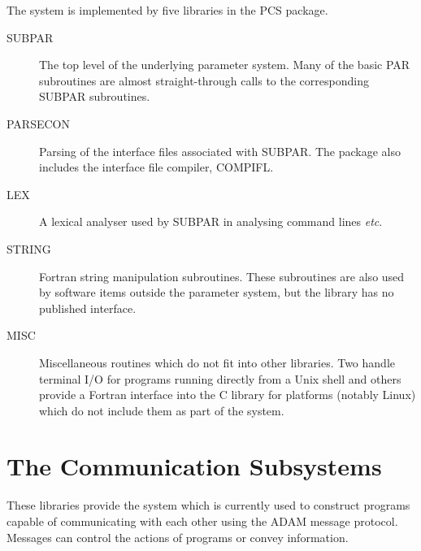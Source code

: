 \documentclass[twoside,11pt]{article}
\newcommand{\xlabel}[1]{}
\renewcommand{\_}{\texttt{\symbol{95}}}
\begin{document}
The system is implemented by five libraries in the PCS package.
\begin{description}
\item[SUBPAR] The top level of the underlying parameter system. Many
of the basic PAR subroutines are almost straight-through calls to the 
corresponding SUBPAR subroutines.
\item[PARSECON] Parsing of the interface files associated with SUBPAR.
The package also includes the interface file compiler, COMPIFL.
\item[LEX] A lexical analyser used by SUBPAR in analysing command lines
\textit{etc}.
\item[STRING] Fortran string manipulation subroutines. These subroutines are
also used by software items outside the parameter system, but the library
has no published interface.
\item[MISC] Miscellaneous routines which do not fit into other libraries.
Two handle terminal I/O for programs running directly from a Unix shell
and others provide a Fortran interface into the C library for platforms 
(notably Linux) which do not include them as part of the system.
\end{description}

\section{\xlabel{the_communication_subsystems}The Communication Subsystems}
These libraries provide the system which is currently used to construct
programs capable of communicating with each other using the ADAM message
protocol. Messages can control the actions of programs or convey information.
\end{document}
